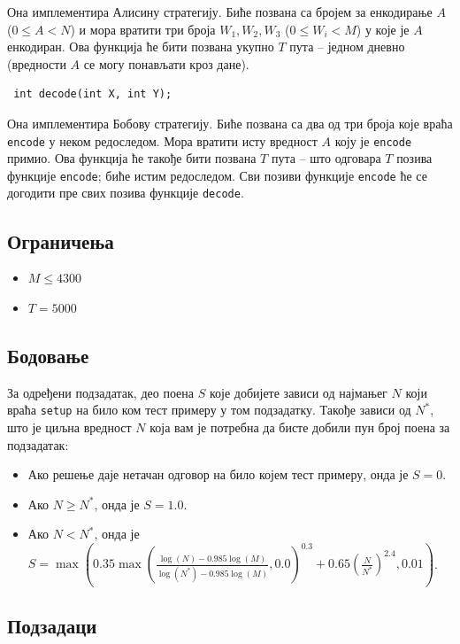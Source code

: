 \documentclass[12pt]{article}
\begin{document}
Она имплементира Алисину стратегију. Биће позвана са бројем за енкодирање $A$ ($0 \leq A < N$) и мора вратити три броја $W_1, W_2, W_3$ ($0 \leq W_i < M$) у које је $A$ енкодиран. Ова функција ће бити позвана укупно $T$ пута -- једном дневно (вредности $A$ се могу понављати кроз дане).

\begin{lstlisting}
 int decode(int X, int Y);
\end{lstlisting}

Она имплементира Бобову стратегију. Биће позвана са два од три броја које враћа \texttt{encode} у неком редоследом. Мора вратити исту вредност $A$ коју је \texttt{encode} примио. Ова функција ће такође бити позвана $T$ пута -- што одговара $T$ позива функције \texttt{encode}; биће истим редоследом. Сви позиви функције \texttt{encode} ће се догодити пре свих позива функције \texttt{decode}.

\subsection{Ограничења}

\begin{itemize}
\item $M \leq 4300$
\item $T = 5000$
\end{itemize}

\subsection{Бодовање}

За одређени подзадатак, део поена $S$ које добијете зависи од најмањег $N$ који враћа \texttt{setup} на било ком тест примеру у том подзадатку. Такође зависи од $N^*$, што је циљна вредност $N$ која вам је потребна да бисте добили пун број поена за подзадатак:

\begin{itemize}
\item Ако решење даје нетачан одговор на било којем тест примеру, онда је $S = 0$.
\item Ако $N \geq N^*$, онда је $S = 1.0$.
\item Ако $N < N^*$, онда је $S = \max\left(0.35 \max\left(\frac{\log(N) - 0.985 \log(M)}{\log(N^*) - 0.985 \log(M)}, 0.0\right)^{0.3} + 0.65 \left(\frac{N}{N^*}\right)^{2.4}, 0.01\right)$.
\end{itemize}

\subsection{Подзадаци}
\end{document}
